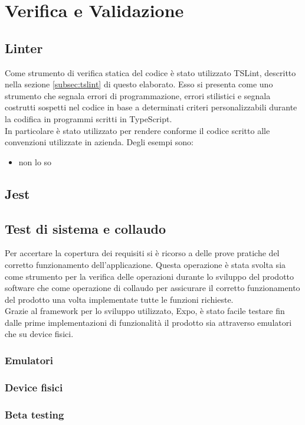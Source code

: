 
\chapter{Verifica e Validazione}\label{chap:tests}
\section{Linter}
Come strumento di verifica statica del codice è stato utilizzato TSLint, descritto nella sezione \ref{subsec:tslint} di questo elaborato. Esso si presenta come uno strumento che segnala errori di programmazione, errori stilistici e segnala costrutti sospetti nel codice in base a determinati criteri personalizzabili durante la codifica in programmi scritti in TypeScript.\\
In particolare è stato utilizzato per rendere conforme il codice scritto alle convenzioni utilizzate in azienda. Degli esempi sono:
\begin{itemize}
	\item non lo so
\end{itemize}
\section{Jest}

\section{Test di sistema e collaudo}
Per accertare la copertura dei requisiti si è ricorso a delle prove pratiche del corretto funzionamento dell’applicazione. Questa operazione è stata svolta sia come strumento per la verifica delle operazioni durante lo sviluppo del prodotto software che come operazione di collaudo per assicurare il corretto funzionamento del prodotto una volta implementate tutte le funzioni richieste. \\
Grazie al framework per lo sviluppo utilizzato, Expo, è stato facile testare fin dalle prime implementazioni di funzionalità il prodotto sia attraverso emulatori che su device fisici.
\subsection{Emulatori}
\subsection{Device fisici}

\subsection{Beta testing}